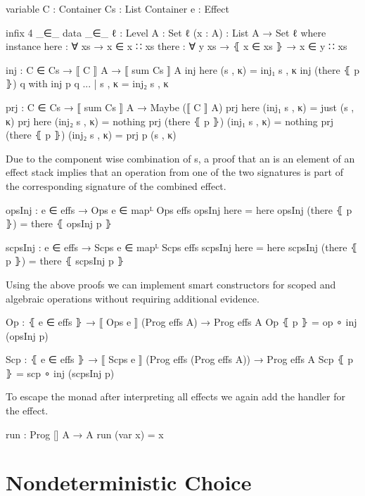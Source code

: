 \begin{code}[hide]
variable
  C  : Container
  Cs : List Container
  e : Effect
\end{code}

\begin{code}[hide]
infix 4 _∈_
data _∈_ {ℓ : Level} {A : Set ℓ} (x : A) : List A → Set ℓ where
  instance
    here   : ∀ {xs} → x ∈ x ∷ xs
    there  : ∀ {y xs} → ⦃ x ∈ xs ⦄ → x ∈ y ∷ xs

inj : C ∈ Cs → ⟦ C ⟧ A → ⟦ sum Cs ⟧ A
inj here          (s , κ) = inj₁ s , κ
inj (there ⦃ p ⦄) q       with inj p q
... | s , κ = inj₂ s , κ

prj : C ∈ Cs → ⟦ sum Cs ⟧ A → Maybe (⟦ C ⟧ A)
prj here           (inj₁ s , κ) = just (s , κ)
prj here           (inj₂ s , κ) = nothing
prj (there ⦃ p ⦄)  (inj₁ s , κ) = nothing
prj (there ⦃ p ⦄)  (inj₂ s , κ) = prj p (s , κ)
\end{code}
Due to the component wise combination of s, a proof that an
 is an element of an effect stack implies that an
operation from one of the two signatures is part of the corresponding
signature of the combined effect.

\begin{code}
opsInj : e ∈ effs → Ops e ∈ mapᴸ Ops effs
opsInj here            = here
opsInj (there ⦃ p ⦄)   = there ⦃ opsInj p ⦄

scpsInj : e ∈ effs → Scps e ∈ mapᴸ Scps effs
scpsInj here           = here
scpsInj (there ⦃ p ⦄)  = there ⦃ scpsInj p ⦄
\end{code}
Using the above proofs we can implement smart constructors for scoped and
algebraic operations without requiring additional evidence.

\begin{code}
Op : ⦃ e ∈ effs ⦄ → ⟦ Ops e ⟧ (Prog effs A) → Prog effs A
Op ⦃ p ⦄ = op ∘ inj (opsInj p)

Scp : ⦃ e ∈ effs ⦄ → ⟦ Scps e ⟧ (Prog effs (Prog effs A)) → Prog effs A
Scp ⦃ p ⦄ = scp ∘ inj (scpsInj p)
\end{code}
To escape the monad after interpreting all effects we again add the
handler for the  effect.

\begin{code}
run : Prog [] A → A
run (var x) = x
\end{code}


\section{Nondeterministic Choice}

